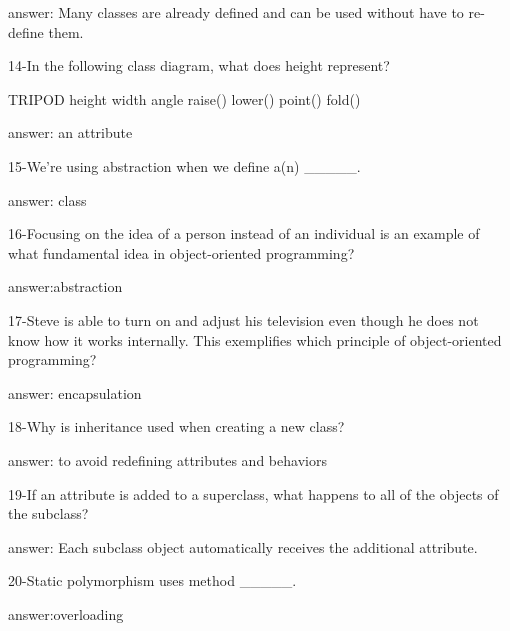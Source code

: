 answer: Many classes are already defined and can be used without have to re-define them.

14-In the following class diagram, what does height represent?

TRIPOD
height
width
angle
raise()
lower()
point()
fold()

answer: an attribute

15-We're using abstraction when we define a(n) _____.


answer: class

16-Focusing on the idea of a person instead of an individual is an example of what fundamental idea in object-oriented programming?


answer:abstraction
 
17-Steve is able to turn on and adjust his television even though he does not know how it works internally. This exemplifies which principle of object-oriented programming?


answer: encapsulation

18-Why is inheritance used when creating a new class?


answer: to avoid redefining attributes and behaviors

19-If an attribute is added to a superclass, what happens to all of the objects of the subclass?


answer: Each subclass object automatically receives the additional attribute.

20-Static polymorphism uses method _____.

answer:overloading
